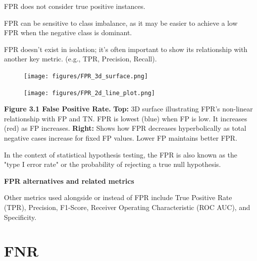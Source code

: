 {
\item FPR does not consider true positive instances.
\item FPR can be sensitive to class imbalance, as it may be easier to achieve a low FPR when the negative class is dominant.
\item FPR doesn't exist in isolation; it's often important to show its relationship with another key metric. (e.g., TPR, Precision, Recall).
}


\clearpage
\thispagestyle{customstyle}


\begin{figure}[ht!]
    \centering
    \texttt{[image: figures/FPR\_3d\_surface.png]}
    \label{fig1}
\end{figure}

\begin{figure}
    \centering
    \vspace{-20pt} %
    \texttt{[image: figures/FPR\_2d\_line\_plot.png]} %
\end{figure}

\textbf{Figure 3.1 False Positive Rate.} 
\textbf{Top:}
3D surface illustrating FPR's non-linear relationship with FP and TN. FPR is lowest (blue) when FP is low. It increases (red) as FP increases.
\textbf{Right:}
Shows how FPR decreases hyperbolically as total negative cases increase for fixed FP values. Lower FP maintains better FPR.


{
In the context of statistical hypothesis testing, the FPR is also known as the "type I error rate" or the probability of rejecting a true null hypothesis.
}

\textbf{FPR alternatives and related metrics}

Other metrics used alongside or instead of FPR include True Positive Rate (TPR), Precision, F1-Score, Receiver Operating Characteristic (ROC AUC), and Specificity.


\clearpage
\section{FNR}

